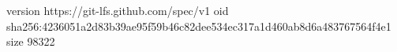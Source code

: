 version https://git-lfs.github.com/spec/v1
oid sha256:4236051a2d83b39ae95f59b46c82dee534ec317a1d460ab8d6a483767564f4e1
size 98322

